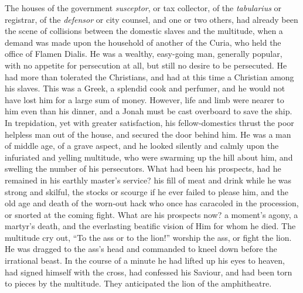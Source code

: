 The houses of the government \emph{susceptor}, or tax collector, of
the \emph{tabularius} or registrar, of the \emph{defensor} or city
counsel, and one or two others, had already been the scene of
collisions between the domestic slaves and the multitude, when a
demand was made upon the household of another of the Curia, who
held the office of Flamen Dialis. He was a wealthy, easy-going man,
generally popular, with no appetite for persecution at all, but still
no desire to be persecuted. He had more than tolerated the Christians,
and had at this time a Christian among his slaves. This was a Greek, a
splendid cook and perfumer, and he would not have lost him for a large
sum of money. However, life and limb were nearer to him even than his
dinner, and a Jonah must be cast overboard to save the ship. In
trepidation, yet with greater satisfaction, his fellow-domestics
thrust the poor helpless man out of the house, and secured the door
behind him. He was a man of middle age, of a grave aspect, and he
looked silently and calmly upon the infuriated and yelling multitude,
who were swarming up the hill about him, and swelling the number of
his persecutors. What had been his prospects, had he remained in his
earthly master's service? his fill of meat and drink while he was
strong and skilful, the stocks or scourge if he ever failed to please
him, and the old age and death of the worn-out hack who once has
caracoled in the procession, or snorted at the coming fight. What are
his prospects now? a moment's agony, a martyr's death, and the
everlasting beatific vision of Him for whom he died. The multitude cry
out, ``To the ass or to the lion!'' worship the ass, or fight
the lion. He was dragged to the ass's head and commanded to kneel down
before the irrational beast. In the course of a minute he had lifted
up his eyes to heaven, had signed himself with the cross, had
confessed his Saviour, and had been torn to pieces by the multitude.
They anticipated the lion of the amphitheatre.


